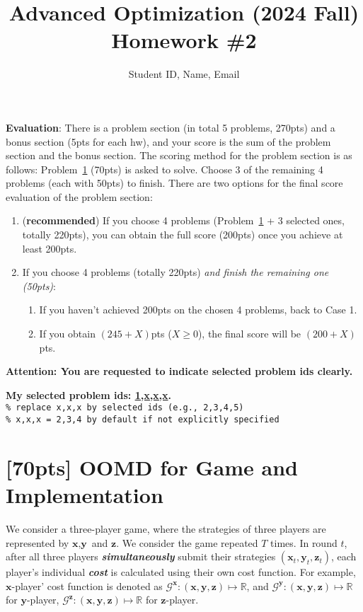 \documentclass[a4paper]{article}
\numberwithin{equation}{section}
\theoremstyle{definition}
\theoremstyle{definition}
\def \R {\mathbb{R}}
\def \x {\textbf{x}}
\def \y {\textbf{y}}
\def \z {\textbf{z}}
\def \Gx {\mathcal{G}^\x}
\def \Gy {\mathcal{G}^\y}
\def \Gz {\mathcal{G}^\z}
\newcommand\mychoice[1]{\textbf{My selected problem ids: \underline{1,#1}.}}
\begin{document}
\title{\textbf{Advanced Optimization (2024 Fall)\\
Homework \#2}}
\author{Student ID, Name, Email}
\maketitle

\begin{tcolorbox}
\textbf{Evaluation}: There is a problem section (in total 5 problems, 270pts) and a bonus section (5pts for each hw), and your score is the sum of the problem section and the bonus section. The scoring method for the problem section is as follows: Problem~\ref{sec:T1} (70pts) is asked to solve. Choose 3 of the remaining 4 problems (each with 50pts) to finish. There are two options for the final score evaluation of the problem section:
\begin{enumerate}
  \item (\textbf{recommended}) If you choose 4 problems (Problem~\ref{sec:T1} + 3 selected ones, totally 220pts), you can obtain the full score (200pts) once you achieve at least 200pts.
  \item If you choose 4 problems (totally 220pts) \emph{and finish the remaining one (50pts)}:
    \begin{enumerate}
      \item If you haven't achieved 200pts on the chosen 4 problems, back to Case 1.
      \item If you obtain $(245+X)$pts ($X \ge 0$), the final score will be $(200+X)$pts.
    \end{enumerate}
\end{enumerate}


\begin{center}
  \textbf{Attention: You are requested to indicate selected problem ids clearly.} 

  {\color{red}\mychoice{x,x,x}}  \\
  \texttt{\% replace x,x,x by selected ids (e.g., 2,3,4,5)}\\
  \texttt{\% x,x,x = 2,3,4 by default if not explicitly specified}
\end{center}
\end{tcolorbox}



\newpage
\section{[70pts] OOMD for Game and Implementation}
\label{sec:T1}
We consider a three-player game, where the strategies of three players are represented by $\x, \y$ and $\z$. We consider the game repeated $T$ times. In round $t$, after all three \mbox{players} \textbf{\emph{simultaneously}} submit their strategies $(\x_t, \y_t, \z_t)$, each player's individual \textbf{\emph{cost}} is \mbox{calculated} using their own cost function. For example, $\x$-player' cost function is denoted as $\Gx:(\x,\y,\z)\mapsto\R$, and $\Gy:(\x,\y,\z)\mapsto\R$ for $\y$-player, $\Gz:(\x,\y,\z)\mapsto\R$ for $\z$-player.
\end{document}

